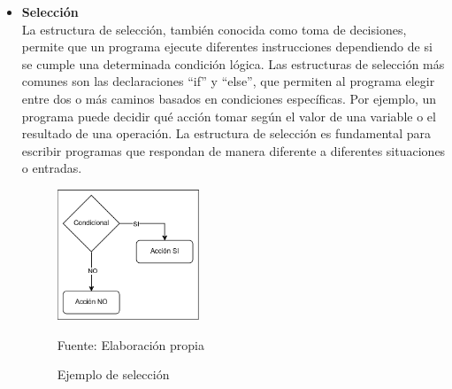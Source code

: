 \begin{itemize}
  \item \textbf{Selección} \\
  La estructura de selección, también conocida como toma de decisiones, permite que un programa ejecute diferentes instrucciones dependiendo de si se cumple una determinada condición lógica. Las estructuras de selección más comunes son las declaraciones ``if'' y ``else'', que permiten al programa elegir entre dos o más caminos basados en condiciones específicas. Por ejemplo, un programa puede decidir qué acción tomar según el valor de una variable o el resultado de una operación. La estructura de selección es fundamental para escribir programas que respondan de manera diferente a diferentes situaciones o entradas.
  \begin{figure}[!h]
    \centering
    \includegraphics[width=0.4\textwidth]{images/seleccion.png}
    \caption{Ejemplo de selección}
    \centering Fuente: Elaboración propia
    \label{fig:seleccion}
  \end{figure}
  \newpage


\end{itemize}
